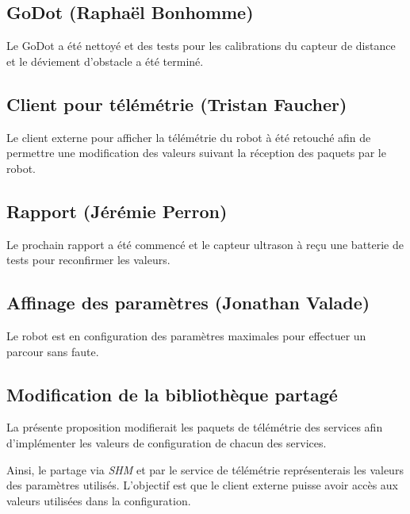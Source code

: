 \subsection{GoDot (Raphaël Bonhomme)}
Le GoDot a été nettoyé et des tests pour les calibrations du capteur de distance et le déviement d'obstacle a été terminé.

\subsection{Client pour télémétrie (Tristan Faucher)}
Le client externe pour afficher la télémétrie du robot à été retouché afin de permettre une modification des valeurs suivant la réception des paquets par le robot.

\subsection{Rapport (Jérémie Perron)}
Le prochain rapport a été commencé et le capteur ultrason à reçu une batterie de tests pour reconfirmer les valeurs.

\subsection{Affinage des paramètres (Jonathan Valade)}
Le robot est en configuration des paramètres maximales pour effectuer un parcour sans faute.

\subsection{Modification de la bibliothèque partagé}
La présente proposition modifierait les paquets de télémétrie des services afin d'implémenter les valeurs de configuration de chacun des services.

Ainsi, le partage via \textit{SHM} et par le service de télémétrie représenterais les valeurs des paramètres utilisés.
L'objectif est que le client externe puisse avoir accès aux valeurs utilisées dans la configuration.